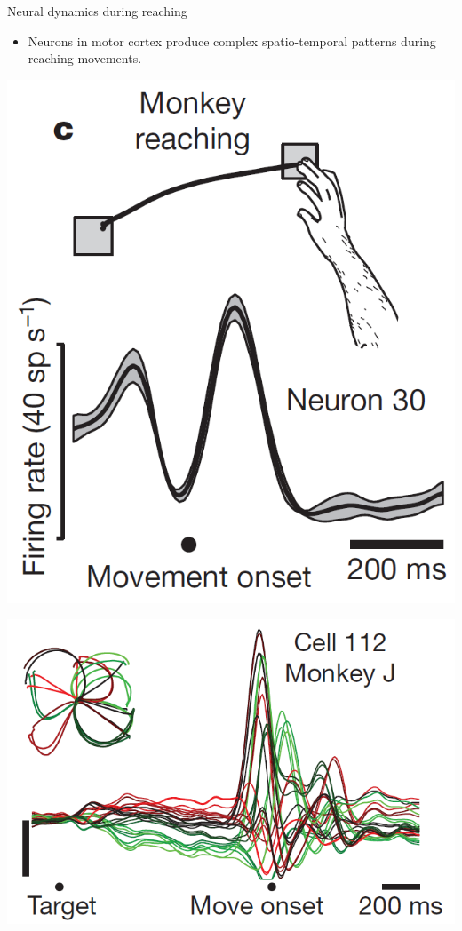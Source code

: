 \documentclass[fleqn]{beamer}
\newcommand{\ppc}[1]{\pause\setcounter{page}{#1}}
\begin{document}
\begin{frame}{Neural dynamics during reaching}
\begin{itemize}
 \item Neurons in motor cortex produce complex spatio-temporal patterns during
reaching movements.
\end{itemize}\ppc{15}
 \begin{minipage}{.48\linewidth}
 \begin{center}
	\includegraphics[width=.7\textwidth]{figures/churchland3}
  \begin{flushright}
      {\footnotesize \cite{Churchland2012}}
  \end{flushright}
\end{center}
\end{minipage}\ppc{15}
\begin{minipage}{.48\linewidth}
 \begin{center}
	\includegraphics[width=.7\textwidth]{figures/churchland4}
\end{center}
\end{minipage}
\end{frame}
\end{document}
